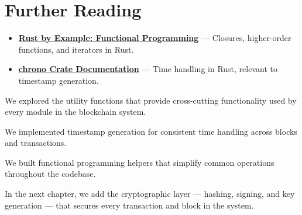 \section{Further Reading}
\label{sec:ch07-further}

\begin{itemize}
  \item \textbf{\href{https://doc.rust-lang.org/rust-by-example/fn.html}{Rust by Example: Functional Programming}} --- Closures, higher-order functions, and iterators in Rust.
  \item \textbf{\href{https://docs.rs/chrono/}{chrono Crate Documentation}} --- Time handling in Rust, relevant to timestamp generation.
\end{itemize}

\begin{chaptersummary}
\item We explored the utility functions that provide cross-cutting functionality used by every module in the blockchain system.
\item We implemented timestamp generation for consistent time handling across blocks and transactions.
\item We built functional programming helpers that simplify common operations throughout the codebase.
\end{chaptersummary}

In the next chapter, we add the cryptographic layer --- hashing, signing, and key
generation --- that secures every transaction and block in the system.
